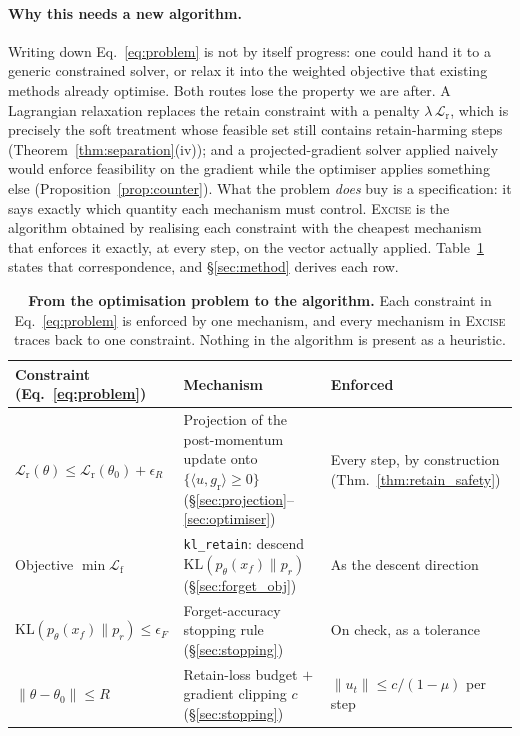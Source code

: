 \documentclass{article}
\newcommand{\ours}{\textsc{Excise}}
\newcommand{\klr}{\texttt{kl\_retain}}
\newcommand{\KL}{\mathrm{KL}}
\newcommand{\gr}{g_{\mathrm{r}}}
\newcommand{\lossf}{\mathcal{L}_{\mathrm{f}}}
\newcommand{\lossr}{\mathcal{L}_{\mathrm{r}}}
\theoremstyle{remark}
\theoremstyle{plain}
\begin{document}
\paragraph{Why this needs a new algorithm.} Writing down
Eq.~\ref{eq:problem} is not by itself progress: one could hand it to a generic
constrained solver, or relax it into the weighted objective that existing
methods already optimise. Both routes lose the property we are after. A
Lagrangian relaxation replaces the retain constraint with a penalty
$\lambda\,\lossr$, which is precisely the soft treatment whose feasible set still
contains retain-harming steps (Theorem~\ref{thm:separation}(iv)); and a
projected-gradient solver applied naively would enforce feasibility on the
gradient while the optimiser applies something else
(Proposition~\ref{prop:counter}). What the problem \emph{does} buy is a
specification: it says exactly which quantity each mechanism must control.
\ours{} is the algorithm obtained by realising each constraint with the cheapest
mechanism that enforces it exactly, at every step, on the vector actually
applied. Table~\ref{tab:constraint_map} states that correspondence, and
\S\ref{sec:method} derives each row.

\begin{table}[t]
\centering
\caption{\textbf{From the optimisation problem to the algorithm.} Each
constraint in Eq.~\ref{eq:problem} is enforced by one mechanism, and every
mechanism in \ours{} traces back to one constraint. Nothing in the algorithm is
present as a heuristic.}
\label{tab:constraint_map}
\begin{tabular}{@{}p{}p{}p{}@{}}
\toprule
\textbf{Constraint (Eq.~\ref{eq:problem})} & \textbf{Mechanism} & \textbf{Enforced} \\
\midrule
$\lossr(\theta) \le \lossr(\theta_0) + \epsilon_R$ &
Projection of the post-momentum update onto $\{\langle u,\gr\rangle \ge 0\}$ (\S\ref{sec:projection}--\ref{sec:optimiser}) &
Every step, by construction (Thm.~\ref{thm:retain_safety}) \\
\addlinespace
Objective $\min \lossf$ &
\klr{}: descend $\KL(p_\theta(x_f)\|p_r)$ (\S\ref{sec:forget_obj}) &
As the descent direction \\
\addlinespace
$\KL(p_\theta(x_f)\|p_r) \le \epsilon_F$ &
Forget-accuracy stopping rule (\S\ref{sec:stopping}) &
On check, as a tolerance \\
\addlinespace
$\|\theta - \theta_0\| \le R$ &
Retain-loss budget $+$ gradient clipping $c$ (\S\ref{sec:stopping}) &
$\|u_t\| \le c/(1-\mu)$ per step \\
\bottomrule
\end{tabular}
\end{table}
\end{document}
